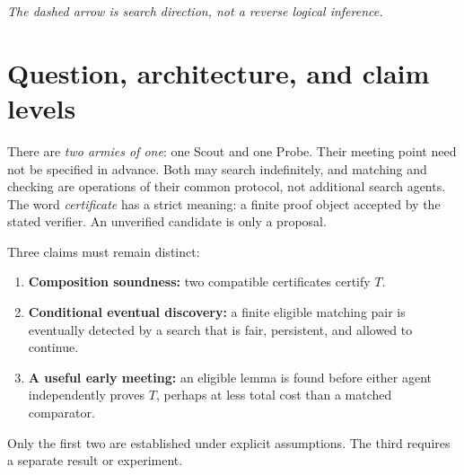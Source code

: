 \documentclass[11pt,letterpaper]{article}
\theoremstyle{definition}
\newcommand{\vdC}{\vdash_{\mathcal C}}
\begin{document}
\vspace{.11in}
\begin{center}
\end{center}
\begin{center}\footnotesize\itshape The dashed arrow is search direction, not a reverse logical inference.\end{center}
\clearpage

\section{Question, architecture, and claim levels}
There are \emph{two armies of one}: one Scout and one Probe. Their meeting point
need not be specified in advance. Both may search indefinitely, and matching
and checking are operations of their common protocol, not additional search agents.
The word \emph{certificate} has a strict meaning: a finite proof object accepted
by the stated verifier. An unverified candidate is only a proposal.

Three claims must remain distinct:
\begin{enumerate}[label=\textbf{\arabic*.}]
\item \textbf{Composition soundness:} two compatible certificates certify $T$.
\item \textbf{Conditional eventual discovery:} a finite eligible matching pair is
 eventually detected by a search that is fair, persistent, and allowed to continue.
\item \textbf{A useful early meeting:} an eligible lemma is found before either agent
 independently proves $T$, perhaps at less total cost than a matched comparator.
\end{enumerate}
Only the first two are established under explicit assumptions. The third
requires a separate result or experiment.
\end{document}
